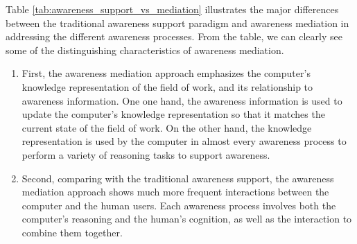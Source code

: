 Table \ref{tab:awareness_support_vs_mediation} illustrates the major differences between the traditional awareness support paradigm and awareness mediation in addressing the different awareness processes. From the table, we can clearly see some of the distinguishing characteristics of awareness mediation. 

\begin{enumerate}
   \item First, the awareness mediation approach emphasizes the computer's knowledge representation of the field of work, and its relationship to awareness information. One one hand, the awareness information is used to update the computer's knowledge representation so that it matches the current state of the field of work. On the other hand, the knowledge representation is used by the computer in almost every awareness process to perform a variety of reasoning tasks to support awareness.
   \item Second, comparing with the traditional awareness support, the awareness mediation approach shows much more frequent interactions between the computer and the human users. Each awareness process involves both the computer's reasoning and the human's cognition, as well as the interaction to combine them together. 
\end{enumerate} 

